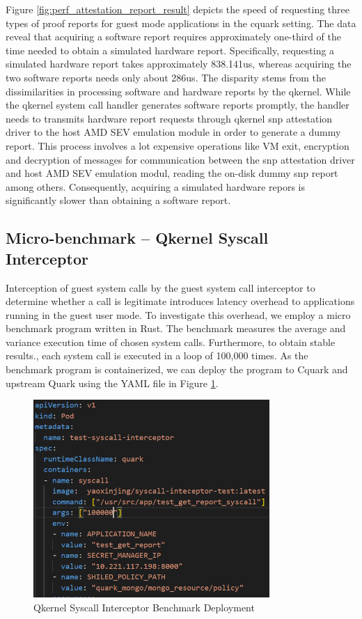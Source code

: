 Figure \ref{fig:perf_attestation_report_result} depicts the speed of requesting three types of proof reports for guest mode applications in the cquark setting. The data reveal that acquiring a software report requires approximately one-third of the time needed to obtain a simulated hardware report. 
Specifically, requesting a simulated hardware report takes approximately 838.141us, whereas acquiring the two software reports needs only about 286us. The disparity stems from the dissimilarities in processing software and hardware reports by the qkernel. While the qkernel 
system call handler generates software reports promptly, the handler needs to transmits hardware report requests through qkernel snp attestation driver to the host AMD SEV emulation module in order to generate a dummy report. This process involves a lot expensive operations like VM exit, 
encryption and decryption of messages for communication between the snp attestation driver and host AMD SEV emulation modul, reading the on-disk dummy snp report among others. Consequently, acquiring a simulated hardware repors is significantly slower than obtaining a software report.


\subsection{Micro-benchmark – Qkernel Syscall Interceptor}

Interception of guest system calls by the guest system call interceptor to determine whether a call is legitimate introduces latency overhead to applications running in the guest user mode.  To investigate this overhead, we employ a micro benchmark program written in Rust.  The benchmark measures the average and variance execution time of chosen system calls. Furthermore, to obtain stable results., each system call is executed in a loop of 100,000 times. As the benchmark program is containerized, we can deploy the program to Cquark and upstream Quark using the YAML file in Figure \ref{fig:syscall_interceptor_yaml}.
\begin{figure}[H]
    \centering
    \includegraphics[width=0.8\textwidth]{images/perf_system_call_interceptor_yaml.PNG}
    \caption[Qkernel Syscall Interceptor Benchmark Deployment]{Qkernel Syscall Interceptor Benchmark Deployment}
    \label{fig:syscall_interceptor_yaml}
\end{figure}


